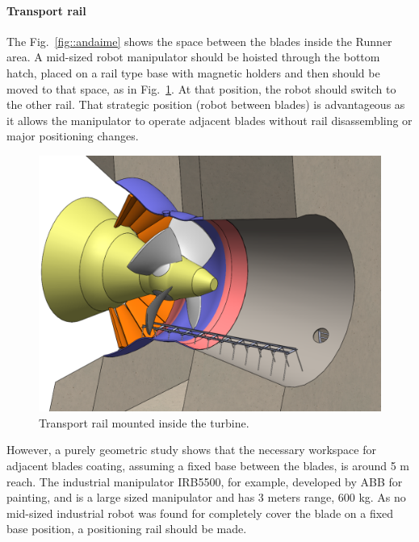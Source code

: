 \paragraph{Transport rail}

The Fig.~\ref{fig::andaime} shows the space between the blades inside the
Runner area. A mid-sized robot manipulator should be hoisted through the bottom
hatch, placed on a rail type base with magnetic holders and then should be moved
to that space, as in Fig.~\ref{fig::rail1}. At that position, the robot should
switch to the other rail. That strategic position (robot between blades) is
advantageous as it allows the manipulator to operate adjacent blades without
rail disassembling or major positioning changes.

\begin{figure}[h!]	
	\includegraphics[width=\columnwidth]{figs/manipuladores/rail1.PNG}
	\caption{Transport rail mounted inside the turbine.}
	\label{fig::rail1}
\end{figure}


However, a purely geometric study shows that the necessary workspace for
adjacent blades coating, assuming a fixed base between the blades,
is around 5 m reach. The industrial manipulator IRB5500, for example, developed
by ABB for painting, and is a large sized manipulator and has 3 meters range,
600 kg.
As no mid-sized industrial robot was found for completely cover
the blade on a fixed base position, a positioning rail should be made.


